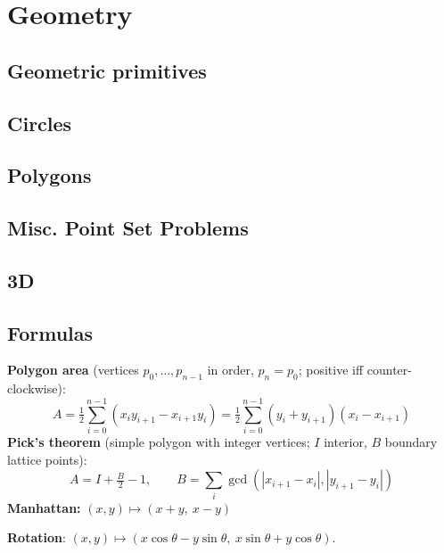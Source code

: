\chapter{Geometry}

\section{Geometric primitives}

\section{Circles}

\section{Polygons}

\section{Misc. Point Set Problems}

\section{3D}


\section{Formulas}
\textbf{Polygon area} (vertices $p_0, \dots, p_{n-1}$ in order, $p_n = p_0$; positive iff counter-clockwise):
\[ A = \tfrac12 \sum_{i=0}^{n-1} (x_i y_{i+1} - x_{i+1} y_i) = \tfrac12 \sum_{i=0}^{n-1} (y_i + y_{i+1})(x_i - x_{i+1}) \]
\textbf{Pick's theorem} (simple polygon with integer vertices; $I$ interior, $B$ boundary lattice points):
\[ A = I + \tfrac{B}{2} - 1, \qquad B = \textstyle\sum_i \gcd(|x_{i+1} - x_i|, |y_{i+1} - y_i|) \]
\textbf{Manhattan:} $(x, y) \mapsto (x + y,\ x - y)$

\textbf{Rotation}: $(x, y) \mapsto (x\cos\theta - y\sin\theta,\ x\sin\theta + y\cos\theta)$.
